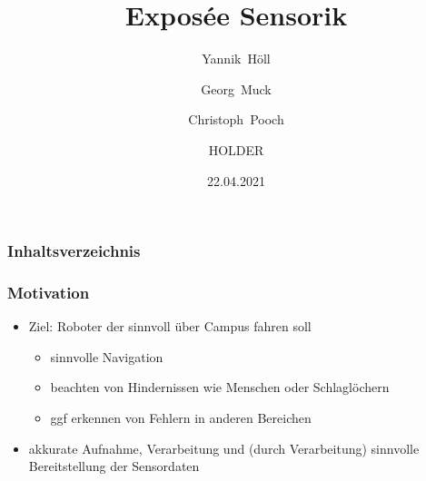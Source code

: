 \documentclass{beamer}
\title{Exposée Sensorik}
\author[Yannik, Georg, Christoph, Gwandil]
	{Yannik~Höll \and Georg~Muck \and Christoph~Pooch \and HOLDER}
\date{22.04.2021}
\begin{document}
	\frame{\titlepage}

\begin{frame}
	\frametitle{Inhaltsverzeichnis}
	\tableofcontents
\end{frame}


\begin{frame}
\frametitle{Motivation}
\begin{itemize}
\item<1-> Ziel: Roboter der sinnvoll über Campus fahren soll
\begin{itemize}
\item<2-4> sinnvolle Navigation
\item<3-4> beachten von Hindernissen wie Menschen oder Schlaglöchern
\item<4> ggf erkennen von Fehlern in anderen Bereichen
\end{itemize}

\item<5-> akkurate \alert<6->{Aufnahme}, \alert<7->{Verarbeitung} und (durch \alert<7->{Verarbeitung}) sinnvolle \alert<8->{Bereitstellung} der Sensordaten


\end{itemize}
\end{frame}
\end{document}
